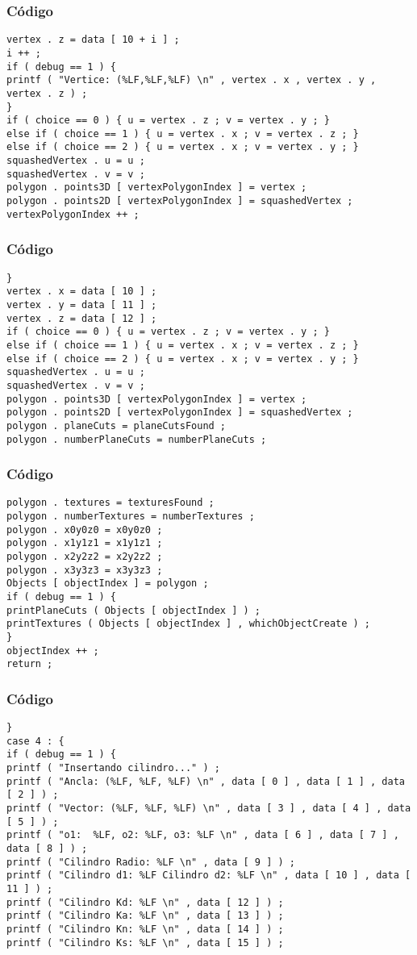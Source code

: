 \documentclass{beamer}
\begin{document}
\begin{frame}[fragile]
\frametitle{C\'odigo}
\begin{verbatim}
vertex . z = data [ 10 + i ] ; 
i ++ ; 
if ( debug == 1 ) { 
printf ( "Vertice: (%LF,%LF,%LF) \n" , vertex . x , vertex . y , vertex . z ) ; 
} 
if ( choice == 0 ) { u = vertex . z ; v = vertex . y ; } 
else if ( choice == 1 ) { u = vertex . x ; v = vertex . z ; } 
else if ( choice == 2 ) { u = vertex . x ; v = vertex . y ; } 
squashedVertex . u = u ; 
squashedVertex . v = v ; 
polygon . points3D [ vertexPolygonIndex ] = vertex ; 
polygon . points2D [ vertexPolygonIndex ] = squashedVertex ; 
vertexPolygonIndex ++ ; 
\end{verbatim}
\end{frame}
\begin{frame}[fragile]
\frametitle{C\'odigo}
\begin{verbatim}
} 
vertex . x = data [ 10 ] ; 
vertex . y = data [ 11 ] ; 
vertex . z = data [ 12 ] ; 
if ( choice == 0 ) { u = vertex . z ; v = vertex . y ; } 
else if ( choice == 1 ) { u = vertex . x ; v = vertex . z ; } 
else if ( choice == 2 ) { u = vertex . x ; v = vertex . y ; } 
squashedVertex . u = u ; 
squashedVertex . v = v ; 
polygon . points3D [ vertexPolygonIndex ] = vertex ; 
polygon . points2D [ vertexPolygonIndex ] = squashedVertex ; 
polygon . planeCuts = planeCutsFound ; 
polygon . numberPlaneCuts = numberPlaneCuts ; 
\end{verbatim}
\end{frame}
\begin{frame}[fragile]
\frametitle{C\'odigo}
\begin{verbatim}
polygon . textures = texturesFound ; 
polygon . numberTextures = numberTextures ; 
polygon . x0y0z0 = x0y0z0 ; 
polygon . x1y1z1 = x1y1z1 ; 
polygon . x2y2z2 = x2y2z2 ; 
polygon . x3y3z3 = x3y3z3 ; 
Objects [ objectIndex ] = polygon ; 
if ( debug == 1 ) { 
printPlaneCuts ( Objects [ objectIndex ] ) ; 
printTextures ( Objects [ objectIndex ] , whichObjectCreate ) ; 
} 
objectIndex ++ ; 
return ; 
\end{verbatim}
\end{frame}
\begin{frame}[fragile]
\frametitle{C\'odigo}
\begin{verbatim}
} 
case 4 : { 
if ( debug == 1 ) { 
printf ( "Insertando cilindro..." ) ; 
printf ( "Ancla: (%LF, %LF, %LF) \n" , data [ 0 ] , data [ 1 ] , data [ 2 ] ) ; 
printf ( "Vector: (%LF, %LF, %LF) \n" , data [ 3 ] , data [ 4 ] , data [ 5 ] ) ; 
printf ( "o1:  %LF, o2: %LF, o3: %LF \n" , data [ 6 ] , data [ 7 ] , data [ 8 ] ) ; 
printf ( "Cilindro Radio: %LF \n" , data [ 9 ] ) ; 
printf ( "Cilindro d1: %LF Cilindro d2: %LF \n" , data [ 10 ] , data [ 11 ] ) ; 
printf ( "Cilindro Kd: %LF \n" , data [ 12 ] ) ; 
printf ( "Cilindro Ka: %LF \n" , data [ 13 ] ) ; 
printf ( "Cilindro Kn: %LF \n" , data [ 14 ] ) ; 
printf ( "Cilindro Ks: %LF \n" , data [ 15 ] ) ; 
\end{verbatim}
\end{frame}
\end{document}
